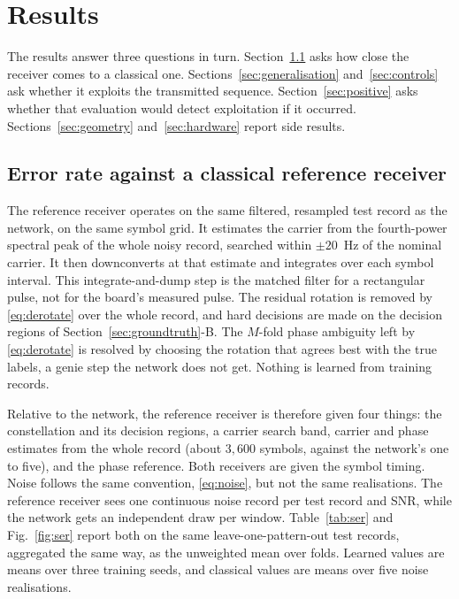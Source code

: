 \documentclass{ieeeaccess}
\begin{document}
\section{Results}

The results answer three questions in turn. Section~\ref{sec:ser} asks how
close the receiver comes to a classical one. Sections~\ref{sec:generalisation}
and~\ref{sec:controls} ask whether it exploits the transmitted sequence.
Section~\ref{sec:positive} asks whether that evaluation would detect
exploitation if it occurred. Sections~\ref{sec:geometry}
and~\ref{sec:hardware} report side results.

\subsection{Error rate against a classical reference receiver}
\label{sec:ser}
The reference receiver operates on the same filtered, resampled test record as
the network, on the same symbol grid. It estimates the carrier from the
fourth-power spectral peak of the whole noisy record, searched within
$\pm 20$~Hz of the nominal carrier. It then downconverts at that estimate and
integrates over each symbol interval. This integrate-and-dump step is the
matched filter for a rectangular pulse, not for the board's measured pulse.
The residual rotation is removed by \eqref{eq:derotate} over the whole record,
and hard decisions are made on the decision regions of
Section~\ref{sec:groundtruth}-B. The $M$-fold phase ambiguity left by
\eqref{eq:derotate} is resolved by choosing the rotation that agrees best with
the true labels, a genie step the network does not get. Nothing is learned
from training records.

Relative to the network, the reference receiver is therefore given four things:
the constellation and its decision regions, a carrier search band, carrier and
phase estimates from the whole record (about $3{,}600$ symbols, against the
network's one to five), and the phase reference. Both receivers are given the
symbol timing. Noise follows the same convention, \eqref{eq:noise}, but not
the same realisations. The reference receiver sees one continuous noise record
per test record and SNR, while the network gets an independent draw per
window. Table~\ref{tab:ser} and Fig.~\ref{fig:ser} report both on the same
leave-one-pattern-out test records, aggregated the same way, as the unweighted
mean over folds. Learned values are means over three training seeds, and
classical values are means over five noise realisations.
\end{document}
